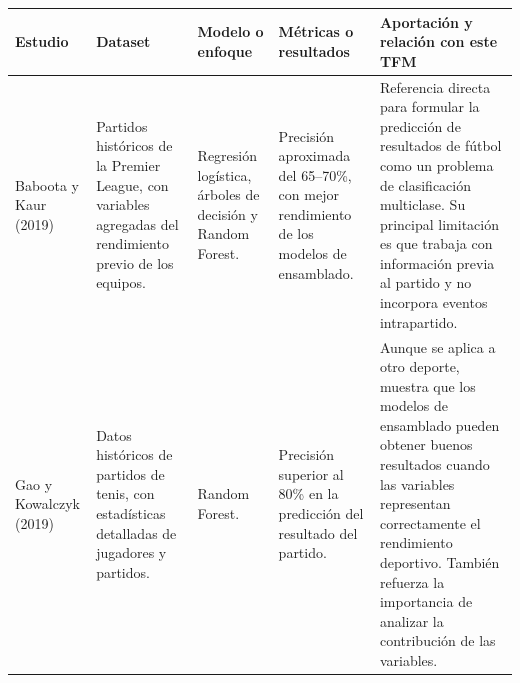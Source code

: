 \begin{table}[H]
    \centering
    \scriptsize
    \renewcommand{\arraystretch}{1.25}
    \begin{tabularx}{\textwidth}{|p{2.5cm}|p{2.7cm}|p{2.7cm}|p{2.5cm}|X|}
        \hline
        \textbf{Estudio}                                                                                                                         & \textbf{Dataset} & \textbf{Modelo o enfoque} & \textbf{Métricas o resultados} & \textbf{Aportación y relación con este TFM} \\
        \hline

        Baboota y Kaur (2019)                                                                                                                    &
        Partidos históricos de la Premier League, con variables agregadas del rendimiento previo de los equipos.                                 &
        Regresión logística, árboles de decisión y Random Forest.                                                                                &
        Precisión aproximada del 65--70\%, con mejor rendimiento de los modelos de ensamblado.                                                   &
        Referencia directa para formular la predicción de resultados de fútbol como un problema de clasificación multiclase. Su principal limitación es que trabaja con información previa al partido y no incorpora eventos intrapartido.                                     \\
        \hline

        Gao y Kowalczyk (2019)                                                                                                                   &
        Datos históricos de partidos de tenis, con estadísticas detalladas de jugadores y partidos.                                              &
        Random Forest.                                                                                                                           &
        Precisión superior al 80\% en la predicción del resultado del partido.                                                                   &
        Aunque se aplica a otro deporte, muestra que los modelos de ensamblado pueden obtener buenos resultados cuando las variables representan correctamente el rendimiento deportivo. También refuerza la importancia de analizar la contribución de las variables.         \\
        \hline


\end{tabularx}
\end{table}
